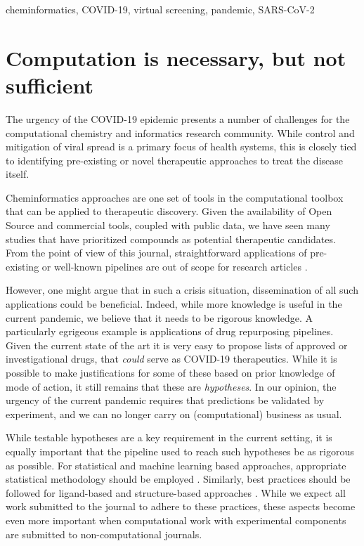 \documentclass{bmcart}
\begin{document}
\begin{frontmatter}
\begin{abstractbox}
\begin{abstract}
\end{abstract}
\begin{keyword}
  cheminformatics, COVID-19, virtual screening, pandemic, SARS-CoV-2
\end{keyword}
\end{abstractbox}

%

\end{frontmatter}



\section*{Computation is necessary, but not sufficient}

The urgency of the COVID-19 epidemic presents a number of challenges
for the computational chemistry and informatics research
community. While control and mitigation of viral spread is a primary
focus of health systems, this is closely tied to identifying
pre-existing or novel therapeutic approaches to treat the disease
itself.

Cheminformatics approaches are one set of tools in the computational
toolbox that can be applied to therapeutic discovery. Given the
availability of Open Source and commercial tools, coupled with public
data, we have seen many studies that have prioritized compounds as
potential therapeutic candidates. From the point of view of this
journal, straightforward applications of pre-existing or well-known
pipelines are out of scope for research articles \cite{jcheminf_scope}.

However, one might argue that in such a crisis situation,
dissemination of all such applications could be beneficial. Indeed,
while more knowledge is useful in the current pandemic, we believe
that it needs to be rigorous knowledge. A particularly egrigeous
example is applications of drug repurposing pipelines. Given the
current state of the art it is very easy to propose lists of approved
or investigational drugs, that \emph{could} serve as COVID-19
therapeutics. While it is possible to make justifications for some of
these based on prior knowledge of mode of action, it still remains
that these are \emph{hypotheses}. In our opinion, the urgency of the
current pandemic requires that predictions be validated by experiment,
and we can no longer carry on (computational) business as usual.

While testable hypotheses are a key requirement in the current
setting, it is equally important that the pipeline used to reach such
hypotheses be as rigorous as possible. For statistical and machine
learning based approaches, appropriate statistical methodology should
be employed \cite{cc_stats_2,cc_stats_1, cc_stats_3}. Similarly, best
practices should be followed for ligand-based \cite{qsar_1, qsar_2}
and structure-based approaches \cite{sbdd_1, sbdd_2}. While we expect
all work submitted to the journal to adhere to these practices, these aspects
become even more important when computational work with experimental
components are submitted to non-computational journals.
\end{document}
